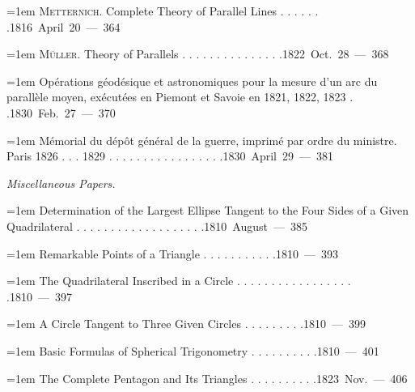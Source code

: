 \par\noindent\hangindent=1em \textsc{Metternich}. Complete Theory of Parallel Lines . . . . . . .\hfill{}\hbox{}\nobreak\hfill\mbox{1816 April 20 — 364}\par
\par\noindent\hangindent=1em \textsc{Müller}. Theory of Parallels . . . . . . . . . . . . . . .\hfill{}\hbox{}\nobreak\hfill\mbox{1822 Oct. 28 — 368}\par
\par\noindent\hangindent=1em Opérations géodésique et astronomiques pour la mesure d’un arc du parallèle moyen, exécutées en Piemont et Savoie en 1821, 1822, 1823 . .\hfill{}\hbox{}\nobreak\hfill\mbox{1830 Feb. 27 — 370}\par
\par\noindent\hangindent=1em Mémorial du dépôt général de la guerre, imprimé par ordre du ministre. Paris 1826 . . . 1829 . . . . . . . . . . . . . . . . .\hfill{}\hbox{}\nobreak\hfill\mbox{1830 April 29 — 381}\par
\par\medskip{}
\noindent\textit{Miscellaneous Papers.}\par
\par\noindent\hangindent=1em Determination of the Largest Ellipse Tangent to the Four Sides of a Given Quadrilateral . . . . . . . . . . . . . . . . . . .\hfill{}\hbox{}\nobreak\hfill\mbox{1810 August — 385}\par
\par\noindent\hangindent=1em Remarkable Points of a Triangle . . . . . . . . . . .\hfill{}\hbox{}\nobreak\hfill\mbox{1810 — 393}\par
\par\noindent\hangindent=1em The Quadrilateral Inscribed in a Circle . . . . . . . . . . . . . . . . . .\hfill{}\hbox{}\nobreak\hfill\mbox{1810 — 397}\par
\par\noindent\hangindent=1em A Circle Tangent to Three Given Circles . . . . . . . . .\hfill{}\hbox{}\nobreak\hfill\mbox{1810 — 399}\par
\par\noindent\hangindent=1em Basic Formulas of Spherical Trigonometry . . . . . . . . . .\hfill{}\hbox{}\nobreak\hfill\mbox{1810 — 401}\par
\par\noindent\hangindent=1em The Complete Pentagon and Its Triangles . . . . . . . . . .\hfill{}\hbox{}\nobreak\hfill\mbox{1823 Nov. — 406}\par

